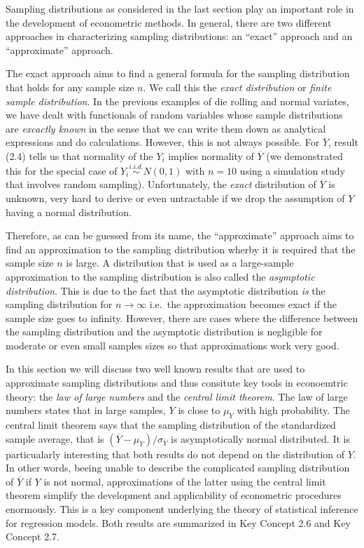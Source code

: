 \documentclass[]{book}
\theoremstyle{definition}
\theoremstyle{definition}
\theoremstyle{definition}
\theoremstyle{remark}
\begin{document}
Sampling distributions as considered in the last section play an
important role in the development of econometric methods. In general,
there are two different approaches in characterizing sampling
distributions: an ``exact'' approach and an ``approximate'' approach.

The exact approach aims to find a general formula for the sampling
distribution that holds for any sample size \(n\). We call this the
\emph{exact distribution} or \emph{finite sample distribution}. In the
previous examples of die rolling and normal variates, we have dealt with
functionals of random variables whose sample distributions are
\emph{excactly known} in the sense that we can write them down as
analytical expressions and do calculations. However, this is not always
possible. For \(\overline{Y}\), result (2.4) tells us that normality of
the \(Y_i\) implies normality of \(\overline{Y}\) (we demonstrated this
for the special case of \(Y_i \overset{i.i.d.}{\sim} N(0,1)\) with
\(n=10\) using a simulation study that involves random sampling).
Unfortunately, the \emph{exact} distribution of \(\overline{Y}\) is
unknown, very hard to derive or even untractable if we drop the
assumption of \(Y\) having a normal distribution.

Therefore, as can be guessed from its name, the ``approximate'' approach
aims to find an approximation to the sampling distribution wherby it is
required that the sample size \(n\) is large. A distribution that is
used as a large-sample approximation to the sampling distribution is
also called the \emph{asymptotic distribution}. This is due to the fact
that the asymptotic distribution \emph{is} the sampling distribution for
\(n \rightarrow \infty\) i.e.~the approximation becomes exact if the
sample size goes to infinity. However, there are cases where the
difference between the sampling distribution and the asymptotic
distribution is negligible for moderate or even small samples sizes so
that approximations work very good.

In this section we will discuss two well known results that are used to
approximate sampling distributions and thus consitute key tools in
econoemtric theory: the \emph{law of large numbers} and the
\emph{central limit theorem}. The law of large numbers states that in
large samples, \(\overline{Y}\) is close to \(\mu_Y\) with high
probability. The central limit theorem says that the sampling
distribution of the standardized sample average, that is
\((\overline{Y} - \mu_Y)/\sigma_{\overline{Y}}\) is asymptotically
normal distributed. It is particualarly interesting that both results do
not depend on the distribution of \(Y\). In other words, beeing unable
to describe the complicated sampling distribution of \(\overline{Y}\) if
\(Y\) is not normal, approximations of the latter using the central
limit theorem simplify the development and applicability of econometric
procedures enormously. This is a key component underlying the theory of
statistical inference for regression models. Both results are summarized
in Key Concept 2.6 and Key Concept 2.7.
\end{document}
